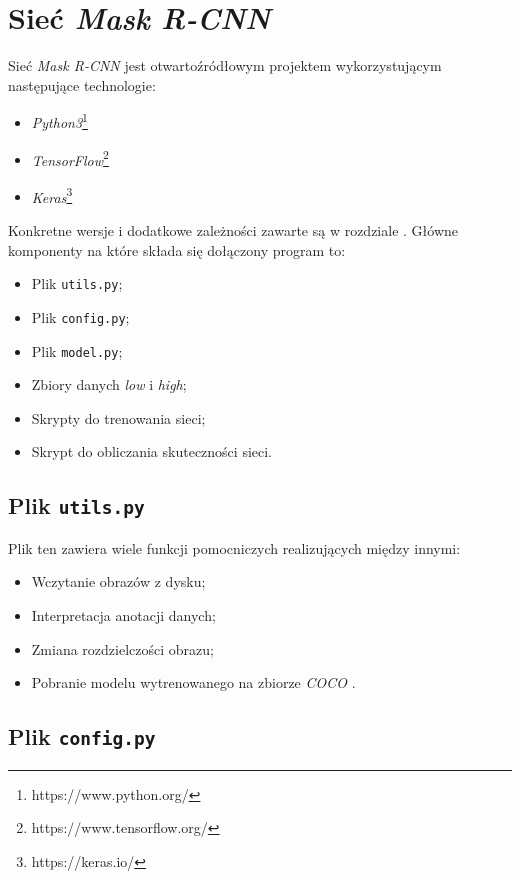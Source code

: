 \newpage
\section{Sieć \textit{Mask R-CNN}}

Sieć \textit{Mask R-CNN} \cite{matterport-mask-rcnn} jest otwartoźródłowym projektem wykorzystującym następujące technologie:
\begin{itemize}
  \item \textit{Python3}\footnote{https://www.python.org/}
  \item \textit{TensorFlow}\footnote{https://www.tensorflow.org/}
  \item \textit{Keras}\footnote{https://keras.io/}
\end{itemize}

Konkretne wersje i dodatkowe zależności zawarte są w rozdziale . Główne komponenty na które składa się dołączony program to:

\begin{itemize}
\item Plik \texttt{utils.py};
  \item Plik \texttt{config.py};
  \item Plik  \texttt{model.py};
  \item Zbiory danych \textit{low} i \textit{high};
  \item Skrypty do trenowania sieci;
  \item Skrypt do obliczania skuteczności sieci.
\end{itemize}

\subsection*{Plik \texttt{utils.py}}

Plik ten zawiera wiele funkcji pomocniczych realizujących między innymi:
\begin{itemize}
  \item Wczytanie obrazów z dysku;
  \item Interpretacja anotacji danych;
  \item Zmiana rozdzielczości obrazu;
  \item Pobranie modelu wytrenowanego na zbiorze \textit{COCO} \cite{coco}.
\end{itemize}

\subsection*{Plik \texttt{config.py}}

